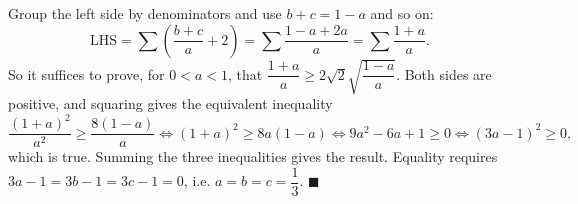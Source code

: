 Group the left side by denominators and use $b+c=1-a$ and so on:
\[\text{LHS}=\sum\left(\dfrac{b+c}{a}+2\right)=\sum\dfrac{1-a+2a}{a}=\sum\dfrac{1+a}{a}.\]
So it suffices to prove, for $0<a<1$, that $\dfrac{1+a}{a}\ge2\sqrt2\sqrt{\dfrac{1-a}{a}}$. Both sides are positive, and squaring gives the equivalent inequality
\[\dfrac{(1+a)^2}{a^2}\ge\dfrac{8(1-a)}{a}\iff(1+a)^2\ge8a(1-a)\iff9a^2-6a+1\ge0\iff(3a-1)^2\ge0,\]
which is true. Summing the three inequalities gives the result. Equality requires $3a-1=3b-1=3c-1=0$, i.e. $\boxed{a=b=c=\dfrac13}$. $\blacksquare$
